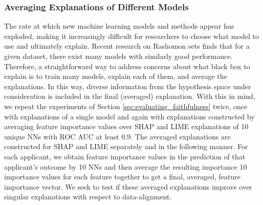 \documentclass[12pt]{article}  %
\newcommand{\tw}[1]{\textcolor{red}{Tong: #1}}
\begin{document}
        \subsubsection{Averaging Explanations of Different Models}
            The rate at which new machine learning models and methods appear has exploded, making it increasingly difficult for researchers to choose what model to use and ultimately explain.  Recent research on Rashomon sets \citep{semenova22rashomon,wang2022timbertrek,donnelly2023rashomon} finds that for a given dataset, there exist many models with similarly good performance. %
            Therefore, a straightforward way to address concerns about what black box to explain is to train many models, explain each of them, and average the explanations. In this way, diverse information from the hypothesis space under consideration is included in the final (averaged) explanation. %
            With this in mind, we repeat the experiments of Section \ref{sec:evaluating_faithfulness} twice, once with explanations of a single model and again with explanations constructed by averaging feature importance values over SHAP and LIME explanations of 10 unique NNs with ROC AUC at least $0.9$. The averaged explanations are constructed for SHAP and LIME separately and in the following manner. For each applicant, we obtain feature importance values in the prediction of that applicant's outcome by 10 NNs and then average the resulting importance 10 importance values for each feature together to get a final, averaged, feature importance vector. We seek to test if these averaged explanations improve over singular explanations with respect to data-alignment.
             
\end{document}
